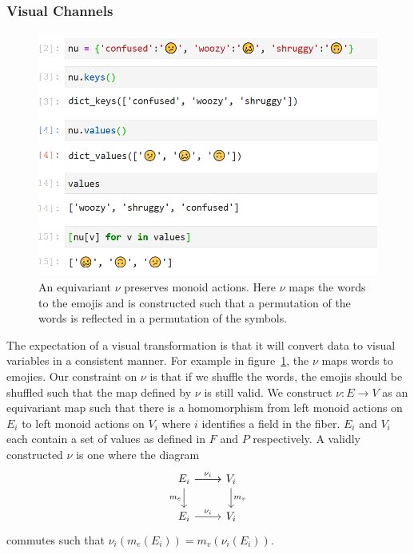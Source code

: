 \documentclass[../main.tex]{subfiles}
\begin{document}
\subsubsection{Visual Channels}
\label{sec:artist_nu}
\begin{figure}[H]
    \includegraphics[width=\textwidth]{figures/math/equivariance_nu.png}
    \caption{An equivariant $\nu$ preserves monoid actions. Here $\nu$ maps the words to the emojis and is constructed such that a permutation of the words is reflected in a permutation of the symbols. }
    \label{fig:artist_nu}
\end{figure}
The expectation of a visual transformation is that it will convert data to visual variables in a consistent manner. For example in figure~\ref{fig:artist_nu}, the $\nu$ maps words to emojies. Our constraint on $\nu$ is that if we shuffle the words, the emojis should be shuffled such that the map defined by $\nu$ is still valid. We construct $\nu: E \rightarrow V$ as an equivariant map such that there is a homomorphism from left monoid actions on $E_{i}$ to left monoid actions on $V_{i}$ where $i$ identifies a field in the fiber. $E_i$ and $V_{i}$ each contain a set of values as defined in $F$ and $P$ respectively. A validly constructed $\nu$ is one where the  diagram 
\begin{equation}
    \label{eq:nu_categorical}
\begin{tikzcd}
    E_i \arrow[r] \arrow[r, "\nu_i"] \arrow[d, "m_e"'] & V_i \arrow[d, "m_v"] \\
    E_i \arrow[r, "\nu_i"]                           & V_i               
\end{tikzcd}
\end{equation}
commutes such that $\nu_i(m_e(E_i)) = m_v(\nu_i(E_i))$.
\end{document}
